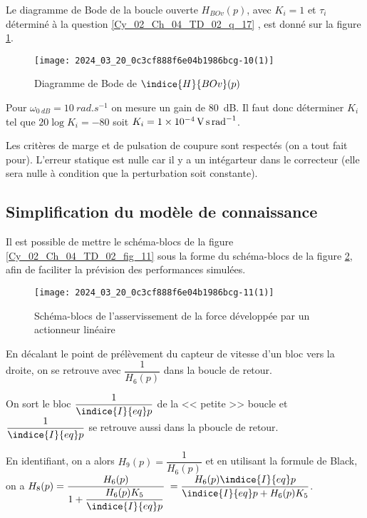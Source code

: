 Le diagramme de Bode de la boucle ouverte $H_{B O v}(p)$, avec $K_{i}=1$ et $\tau_{i}$ déterminé à la question \ref{Cy_02_Ch_04_TD_02_q_17} , est donné sur la figure \ref{Cy_02_Ch_04_TD_02_fig_13}.



\begin{figure}[!h]
\texttt{[image: 2024\_03\_20\_0c3cf888f6e04b1986bcg-10(1)]}
\caption{Diagramme de Bode de $\indice{H}{BOv}(p)$ \label{Cy_02_Ch_04_TD_02_fig_13}}
\end{figure}


\ifprof
\begin{corrige}
Pour $\omega_{\SI{0}{dB}}=\SI{10}{rad.s^{-1}}$ on mesure un gain de \SI{80}{dB}. 
Il faut donc déterminer $K_i$ tel que $20\log K_i = -80$ soit $K_i = \SI{1e{-4}}{V.s.rad^{-1}} $. 


Les critères de marge et de pulsation de coupure sont respectés (on a tout fait pour).
L'erreur statique est nulle car il y a un intégarteur dans le correcteur (elle sera nulle à condition que la perturbation soit constante).

\end{corrige}
\else
\fi

\subsection*{Simplification du modèle de connaissance}
Il est possible de mettre le schéma-blocs de la figure \ref{Cy_02_Ch_04_TD_02_fig_11} 
sous la forme du schéma-blocs de la figure \ref{Cy_02_Ch_04_TD_02_fig_14}, afin de faciliter la prévision des performances simulées.

\begin{figure}[!h]
\texttt{[image: 2024\_03\_20\_0c3cf888f6e04b1986bcg-11(1)]}
\caption{Schéma-blocs de l'asservissement de la force développée par un actionneur linéaire \label{Cy_02_Ch_04_TD_02_fig_14}}
\end{figure}

\ifprof
\begin{corrige}
En décalant le point de prélèvement du capteur de vitesse d'un bloc vers la droite, on se retrouve avec $\dfrac{1}{H_6(p)}$ dans la boucle de retour. 

On sort le bloc $\dfrac{1}{\indice{I}{eq}p}$ de la << petite >> boucle et $\dfrac{1}{\indice{I}{eq}p}$ se retrouve aussi dans la pboucle de retour. 

En identifiant, on a alors $H_9(p)=\dfrac{1}{H_6(p)}$ et en utilisant la formule de Black, on a 
$H_8(p)=\dfrac{H_6(p)}{1+ \dfrac{H_6(p) K_5}{\indice{I}{eq}p} }$ $=\dfrac{H_6(p) \indice{I}{eq}p}{\indice{I}{eq}p+H_6(p) K_5 }$.


\end{corrige}
\else
\fi

